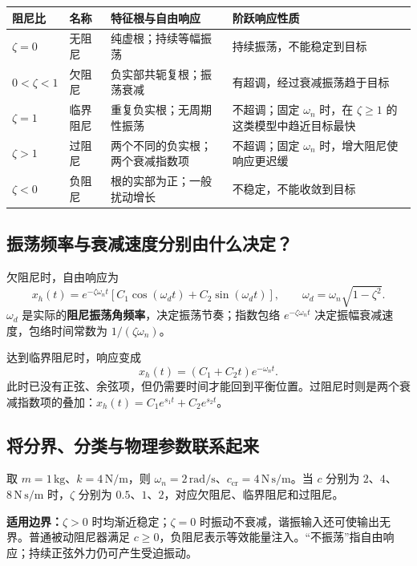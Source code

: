 \documentclass[UTF8,a4paper,11pt,fontset=windows]{ctexart}
\newcommand{\unit}[1]{\,\mathrm{#1}}
\begin{document}
\noindent
\begin{tabularx}{\linewidth}{@{}p{24mm}p{17mm}YY@{}}
\toprule
阻尼比 & 名称 & 特征根与自由响应 & 阶跃响应性质 \\
\midrule
$\zeta=0$ & 无阻尼 & 纯虚根；持续等幅振荡 & 持续振荡，不能稳定到目标 \\
\addlinespace[3pt]
$0<\zeta<1$ & 欠阻尼 & 负实部共轭复根；振荡衰减 & 有超调，经过衰减振荡趋于目标 \\
\addlinespace[3pt]
$\zeta=1$ & 临界阻尼 & 重复负实根；无周期性振荡 & 不超调；固定 $\omega_n$ 时，在 $\zeta\geq1$ 的这类模型中趋近目标最快 \\
\addlinespace[3pt]
$\zeta>1$ & 过阻尼 & 两个不同的负实根；两个衰减指数项 & 不超调；固定 $\omega_n$ 时，增大阻尼使响应更迟缓 \\
\addlinespace[3pt]
$\zeta<0$ & 负阻尼 & 根的实部为正；一般扰动增长 & 不稳定，不能收敛到目标 \\
\bottomrule
\end{tabularx}

\subsection{振荡频率与衰减速度分别由什么决定？}
欠阻尼时，自由响应为
\begin{equation}\label{eq:underdamped}
  x_h(t)=e^{-\zeta\omega_n t}\left[C_1\cos(\omega_dt)+C_2\sin(\omega_dt)\right],
  \qquad \omega_d=\omega_n\sqrt{1-\zeta^2}.
\end{equation}
$\omega_d$ 是实际的\textbf{阻尼振荡角频率}，决定振荡节奏；指数包络 $e^{-\zeta\omega_n t}$ 决定振幅衰减速度，包络时间常数为 $1/(\zeta\omega_n)$。

达到临界阻尼时，响应变成
\begin{equation}\label{eq:critical-response}
  x_h(t)=(C_1+C_2t)e^{-\omega_n t}.
\end{equation}
此时已没有正弦、余弦项，但仍需要时间才能回到平衡位置。过阻尼时则是两个衰减指数项的叠加：$x_h(t)=C_1e^{s_1t}+C_2e^{s_2t}$。

\subsection{将分界、分类与物理参数联系起来}
取 $m=1\unit{kg}$、$k=4\unit{N/m}$，则 $\omega_n=2\unit{rad/s}$、$c_{\mathrm{cr}}=4\unit{N\,s/m}$。当 $c$ 分别为 $2$、$4$、$8\unit{N\,s/m}$ 时，$\zeta$ 分别为 $0.5$、$1$、$2$，对应欠阻尼、临界阻尼和过阻尼。

\begin{keybox}
\textbf{适用边界：}$\zeta>0$ 时均渐近稳定；$\zeta=0$ 时振动不衰减，谐振输入还可使输出无界。普通被动阻尼器满足 $c\geq0$，负阻尼表示等效能量注入。“不振荡”指自由响应；持续正弦外力仍可产生受迫振动。
\end{keybox}
\end{document}
